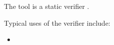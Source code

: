 The \TOOL{} tool is a static verifier . %

Typical uses of the verifier include: %
\begin{itemize}
\item 
\end{itemize}
